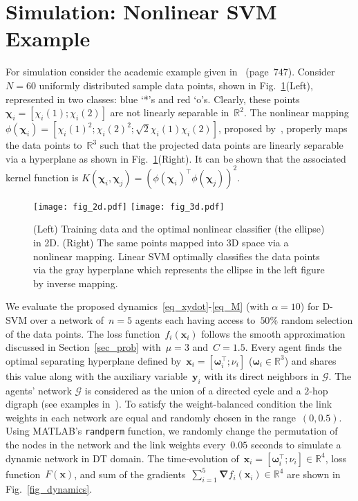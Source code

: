 \documentclass[letterpaper, 10pt, conference]{ieeeconf}
\def\mb{\mathbf}
\def\mc{\mathcal}
\begin{document}
\section{Simulation: Nonlinear SVM Example} \label{sec_sim}
For simulation consider the academic example given in~\cite{russell2010artificial} (page~$747$). Consider~$N=60$ uniformly distributed sample data points, shown in Fig.~\ref{fig_data}(Left), represented in two classes:  blue `*'s and  red `o's. Clearly, these points~$\boldsymbol{\chi}_i=[{\chi}_i(1);{\chi}_i(2)]$ are not linearly separable in~$\mathbb{R}^2$. The nonlinear mapping~$\phi(\boldsymbol{\chi}_i) = [{\chi}_i(1)^2;{\chi}_i(2)^2;\sqrt{2}{\chi}_i(1){\chi}_i(2)]$, proposed by~\cite{russell2010artificial}, properly maps the data points to~$\mathbb{R}^3$ such that the projected data points are linearly separable via a hyperplane as shown in Fig.~\ref{fig_data}(Right). It can be shown that  the associated kernel function is
$K(\boldsymbol{\chi}_i,\boldsymbol{\chi}_j)=(\phi(\boldsymbol{\chi}_i)^\top \phi(\boldsymbol{\chi}_j))^2$. 
\begin{figure}[]
	\centering
	\texttt{[image: fig\_2d.pdf]}
	\hspace{0.2cm}
	\texttt{[image: fig\_3d.pdf]}	
	\caption{(Left) Training data and the optimal nonlinear classifier (the ellipse) in 2D. (Right) The same points mapped into 3D space via a nonlinear mapping. Linear SVM optimally classifies the data points via the gray hyperplane which represents the  ellipse in the left figure by inverse mapping.     }
	\label{fig_data}
\end{figure}
We evaluate the proposed dynamics~\eqref{eq_xydot}-\eqref{eq_M} (with $\alpha=10$) for D-SVM over a network of~$n=5$ agents each having access to~$50\%$ random selection of the data points. 
The loss function~$f_i(\mb{x}_i)$ follows the smooth approximation discussed in Section~\ref{sec_prob} with~$\mu=3$ and~$C=1.5$. Every agent finds the optimal separating hyperplane defined by~$\mb{x}_i = [\boldsymbol{\omega}_i^\top;\nu_i]$ ($\boldsymbol{\omega}_i \in \mathbb{R}^3$) and shares this value along with the auxiliary variable~$\mb{y}_i$ with its direct neighbors in $\mc{G}$. The agents' network $\mc{G}$ is considered as the union of a directed cycle and a $2$-hop digraph
(see examples in~\cite{xin2020general}). To satisfy the weight-balanced condition the link weights in each network are equal and randomly chosen in the range~$(0,0.5)$. Using MATLAB's \texttt{randperm} function, we randomly change the permutation of the nodes in the network and the link weights every~$0.05$ seconds to simulate  a dynamic network in DT domain. The time-evolution of~$\mb{x}_i  = [\boldsymbol{\omega}_i^\top;\nu_i] \in \mathbb{R}^4$, loss function~$F(\mb{x})$, and sum of the gradients~$\sum_{i=1}^{5} \boldsymbol{ \nabla} f_i(\mb{x}_i) \in \mathbb{R}^4$ are shown in  Fig.~\ref{fig_dynamics}. 
\end{document}
